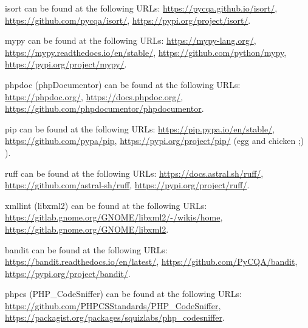 \documentclass{article}
\begin{document}
isort can be found at the following URLs:\newline
\url{https://pycqa.github.io/isort/},\newline
\url{https://github.com/pycqa/isort/},\newline
\url{https://pypi.org/project/isort/}.

mypy can be found at the following URLs:\newline
\url{https://mypy-lang.org/},\newline
\url{https://mypy.readthedocs.io/en/stable/},\newline
\url{https://github.com/python/mypy},\newline
\url{https://pypi.org/project/mypy/}.

phpdoc (phpDocumentor) can be found at the following URLs:\newline
\url{https://phpdoc.org/},\newline
\url{https://docs.phpdoc.org/},\newline
\url{https://github.com/phpdocumentor/phpdocumentor}.

pip can be found at the following URLs:\newline
\url{https://pip.pypa.io/en/stable/},\newline
\url{https://github.com/pypa/pip},\newline
\url{https://pypi.org/project/pip/} (egg and chicken ;) ).

ruff can be found at the following URLs:\newline
\url{https://docs.astral.sh/ruff/},\newline
\url{https://github.com/astral-sh/ruff},\newline
\url{https://pypi.org/project/ruff/}.

xmllint (libxml2) can be found at the following URLs:\newline
\url{https://gitlab.gnome.org/GNOME/libxml2/-/wikis/home},\newline
\url{https://gitlab.gnome.org/GNOME/libxml2}.

bandit can be found at the following URLs:\newline
\url{https://bandit.readthedocs.io/en/latest/},\newline
\url{https://github.com/PyCQA/bandit},\newline
\url{https://pypi.org/project/bandit/}.

phpcs (PHP\_CodeSniffer) can be found at the following URLs:\newline
\url{https://github.com/PHPCSStandards/PHP_CodeSniffer},\newline
\url{https://packagist.org/packages/squizlabs/php_codesniffer}.
\end{document}
